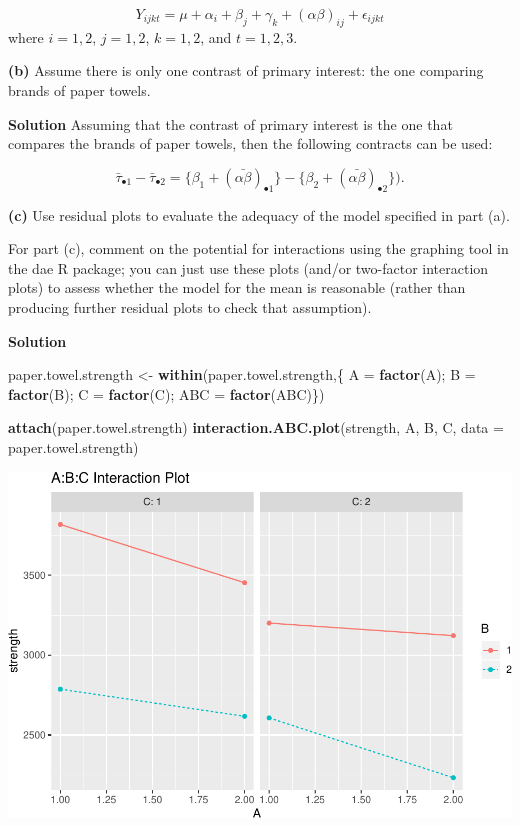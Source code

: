 \documentclass[12pt,]{article}
\newenvironment{Shaded}{\begin{snugshade}}{\end{snugshade}}
\newcommand{\KeywordTok}[1]{\textcolor[rgb]{0.13,0.29,0.53}{\textbf{#1}}}
\newcommand{\DataTypeTok}[1]{\textcolor[rgb]{0.13,0.29,0.53}{#1}}
\newcommand{\StringTok}[1]{\textcolor[rgb]{0.31,0.60,0.02}{#1}}
\newcommand{\NormalTok}[1]{#1}
\begin{document}
\[
Y_{ijk t} = \mu + \alpha_i + \beta_j + \gamma_k + (\alpha \beta)_{ij} + \epsilon_{ijk t}
\] where \(i = 1, 2\), \(j =1, 2\), \(k= 1,2\), and \(t=1,2,3\).

\textbf{(b)} Assume there is only one contrast of primary interest: the
one comparing brands of paper towels.

\textbf{Solution} Assuming that the contrast of primary interest is the
one that compares the brands of paper towels, then the following
contracts can be used:

\[
\bar{\tau}_{\bullet 1} - \bar{\tau}_{\bullet 2} = \{\beta_1 + (\bar{\alpha \beta})_{\bullet 1} \} - \{\beta_2 + (\bar{\alpha \beta})_{\bullet 2} \}).
\]

\textbf{(c)} Use residual plots to evaluate the adequacy of the model
specified in part (a).

For part (c), comment on the potential for interactions using the
graphing tool in the dae R package; you can just use these plots (and/or
two-factor interaction plots) to assess whether the model for the mean
is reasonable (rather than producing further residual plots to check
that assumption).

\textbf{Solution}

\begin{Shaded}
\begin{Highlighting}[]
\NormalTok{paper.towel.strength <-}\StringTok{ }\KeywordTok{within}\NormalTok{(paper.towel.strength,\{}
\NormalTok{  A =}\StringTok{ }\KeywordTok{factor}\NormalTok{(A); B =}\StringTok{ }\KeywordTok{factor}\NormalTok{(B); C =}\StringTok{ }\KeywordTok{factor}\NormalTok{(C); ABC =}\StringTok{ }\KeywordTok{factor}\NormalTok{(ABC)\})}

\KeywordTok{attach}\NormalTok{(paper.towel.strength)}
\KeywordTok{interaction.ABC.plot}\NormalTok{(strength, A, B, C, }\DataTypeTok{data =}\NormalTok{ paper.towel.strength)}
\end{Highlighting}
\end{Shaded}

\includegraphics{Markdown_HW_7_files/figure-latex/unnamed-chunk-2-1.pdf}
\end{document}
